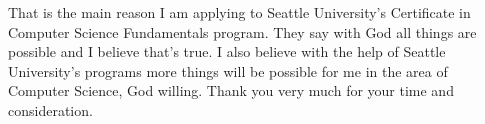 \documentclass[12pt]{article}
\begin{document}
That is the main reason I am applying to Seattle University's Certificate in Computer Science Fundamentals program. They say with God all things are possible and I believe that's true. I also believe with the help of Seattle University's programs more things will be possible for me in the area of Computer Science, God willing. Thank you very much for your time and consideration.
\end{document}
